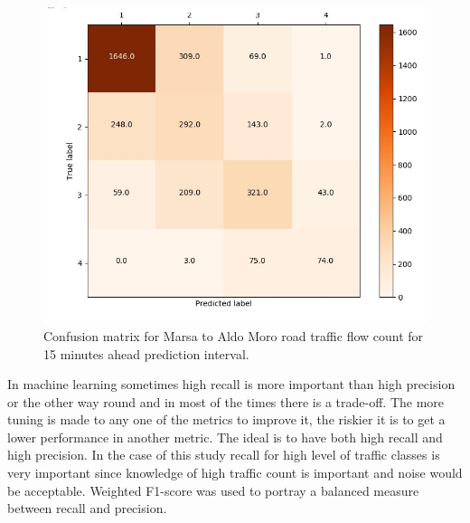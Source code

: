 \documentclass[12pt, a4paper]{report}
\theoremstyle{definition}
\theoremstyle{definition}%
\theoremstyle{definition}%
\theoremstyle{definition}%
\theoremstyle{definition}%
\theoremstyle{definition}%
\begin{document}
\begin{figure}[h]	
	\includegraphics[scale=0.5]{confusion_matrix_marsa_aldo_moro_342_4bin_15min.jpg}
	\centering
	\caption[Confusion matrix Marsa to Aldo Moro traffic flow prediciton]{Confusion matrix for Marsa to Aldo Moro road traffic flow count for 15 minutes ahead prediction interval.}
	\label{fig:confusion_matrix_marsa_aldo_moro_15min}
\end{figure}

In machine learning sometimes high recall is more important than high precision or the other way round and in most of the times there is a trade-off. The more tuning is made to any one of the metrics to improve it, the riskier it is to get a lower performance in another metric.  The ideal is to have both high recall and high precision. In the case of this study recall for high level of traffic classes is very important since knowledge of high traffic count is important and noise would be acceptable. Weighted F1-score was used to portray a balanced measure between recall and precision.
\end{document}
